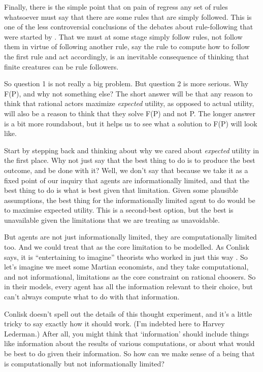 \documentclass[
  11pt,
]{book}
\begin{document}
Finally, there is the simple point that on pain of regress any set of rules whatsoever must say that there are some rules that are simply followed. This is one of the less controversial conclusions of the debates about rule-following that were started by \citet{Wittgenstein1953}. That we must at some stage simply follow rules, not follow them in virtue of following another rule, say the rule to compute how to follow the first rule and act accordingly, is an inevitable consequence of thinking that finite creatures can be rule followers.

So question 1 is not really a big problem. But question 2 is more serious. Why F(P), and why not something else? The short answer will be that any reason to think that rational actors maximize \emph{expected} utility, as opposed to actual utility, will also be a reason to think that they solve F(P) and not P. The longer answer is a bit more roundabout, but it helps us to see what a solution to F(P) will look like.

Start by stepping back and thinking about why we cared about \emph{expected} utility in the first place. Why not just say that the best thing to do is to produce the best outcome, and be done with it? Well, we don't say that because we take it as a fixed point of our inquiry that agents are informationally limited, and that the best thing to do is what is best given that limitation. Given some plausible assumptions, the best thing for the informationally limited agent to do would be to maximise expected utility. This is a second-best option, but the best is unavailable given the limitations that we are treating as unavoidable.

But agents are not just informationally limited, they are computationally limited too. And we could treat that as the core limitation to be modelled. As Conlisk says, it is ``entertaining to imagine'' theorists who worked in just this way \citep[ 691]{Conlisk1996}. So let's imagine we meet some Martian economists, and they take computational, and not informational, limitations as the core constraint on rational choosers. So in their models, every agent has all the information relevant to their choice, but can't always compute what to do with that information.

Conlisk doesn't spell out the details of this thought experiment, and it's a little tricky to say exactly how it should work. (I'm indebted here to Harvey Lederman.) After all, you might think that `information' should include things like information about the results of various computations, or about what would be best to do given their information. So how can we make sense of a being that is computationally but not informationally limited?
\end{document}
